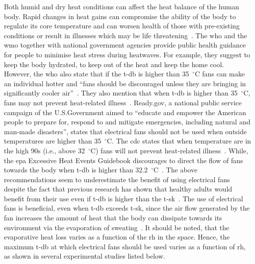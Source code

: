 Both humid and dry heat conditions can affect the heat balance of the human body.
Rapid changes in heat gains can compromise the ability of the body to regulate its core temperature and can worsen health of those with pre-existing conditions or result in illnesses which may be life threatening~\cite{WMO2015}.
The \ac{who} and the \ac{wmo} together with national government agencies provide public health guidance for people to minimise heat stress during heatwaves.
For example, they suggest to keep the body hydrated, to keep out of the heat and keep the home cool.
However, the \ac{who} also state that if the \ac{t-db} is higher than 35~$^{\circ}$C fans can make an individual hotter and ``fans should be discouraged unless they are bringing in significantly cooler air''~\cite{WMO2015}.
They also mention that when \ac{t-db} is higher than 35~$^{\circ}$C, fans may not prevent heat-related illness~\cite{HeatandH28:online}.
Ready.gov, a national public service campaign of the U.S.\@ Government aimed to ``educate and empower the American people to prepare for, respond to and mitigate emergencies, including natural and man-made disasters'', states that electrical fans should not be used when outside temperatures are higher than 35~$^{\circ}$C\@.
The \ac{cdc} states that when temperature are in the high 90s (i.e., above 32~$^{\circ}$C) fans will not prevent heat-related illness~\cite{ExtremeH66:online}.
While, the \ac{epa} Excessive Heat Events Guidebook discourages to direct the flow of fans towards the body when \ac{t-db} is higher than 32.2~$^{\circ}$C~\cite{UnitedStatesEnvironmentalProtectionAgency2006}.
The above recommendations seem to underestimate the benefit of using electrical fans despite the fact that previous research has shown that healthy adults would benefit from their use even if \ac{t-db} is higher than the \ac{t-sk}~\cite{Rate2015, Jay2015, Jay2019a, Rate2015, Gagnon2017}.
The use of electrical fans is beneficial, even when \ac{t-db} exceeds \ac{t-sk}, since the air flow generated by the fan increases the amount of heat that the body can dissipate towards its environment via the evaporation of sweating~\cite{Jay2015}.
It should be noted, that the evaporative heat loss varies as a function of the \ac{rh} in the space.
Hence, the maximum \ac{t-db} at which electrical fans should be used varies as a function of \ac{rh}, as shown in several experimental studies listed below.

